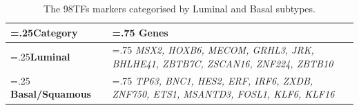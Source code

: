 \begin{table}[H]
  \centering
  \begin{tabularx}{\textwidth}{>{\hsize=.25\hsize}X|>{\hsize=.75\hsize}X}
    \toprule
    \textbf{Category} & \textbf{Genes} \\
    \midrule
    \textbf{Luminal} & \textit{MSX2, HOXB6, MECOM, GRHL3, JRK, BHLHE41, ZBTB7C, ZSCAN16, ZNF224, ZBTB10} \\
    \midrule
    \textbf{Basal/Squamous} & \textit{TP63, BNC1, HES2, ERF, IRF6, ZXDB, ZNF750, ETS1, MSANTD3, FOSL1, KLF6, KLF16} \\
    \bottomrule
  \end{tabularx}
  \caption{The 98TFs markers categorised by Luminal and Basal subtypes.} %
  \label{tab:N_I:genes_lum_basal}
\end{table}

